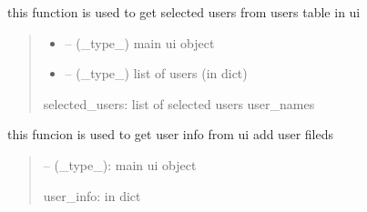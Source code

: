 \documentclass[letterpaper,10pt,english]{sphinxmanual}
\begin{document}
\begin{savenotes}\begin{fulllineitems}
\label{\detokenize{setting/backend/user_management_funcs:oxin.backend.user_management_funcs.get_selected_users}}
\pysigstartsignatures
{}
\pysigstopsignatures
\sphinxAtStartPar
this function is used to get selected users from users table in ui
\begin{quote}\begin{description}
\begin{itemize}
\item {} 
\sphinxAtStartPar
{} – (\_type\_) main ui object

\item {} 
\sphinxAtStartPar
{} – (\_type\_) list of users (in dict)

\end{itemize}

\sphinxAtStartPar
selected\_users: list of selected users user\_names

\end{description}\end{quote}

\end{fulllineitems}\end{savenotes}


\begin{savenotes}\begin{fulllineitems}
\label{\detokenize{setting/backend/user_management_funcs:oxin.backend.user_management_funcs.get_user_info_from_ui}}
\pysigstartsignatures
{}
\pysigstopsignatures
\sphinxAtStartPar
this funcion is used to get user info from ui add user fileds
\begin{quote}\begin{description}
\sphinxAtStartPar
{} – (\_type\_): main ui object

\sphinxAtStartPar
user\_info: in dict

\end{description}\end{quote}

\end{fulllineitems}\end{savenotes}
\end{document}
